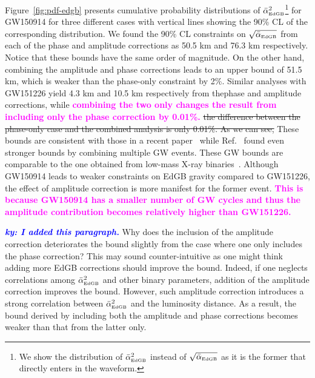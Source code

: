 \documentclass[prd,twocolumn,nofootinbib]{revtex4-1}
\newcommand{\EDGB}{{\mbox{\tiny EdGB}}}
\newcommand{\ky}[1]{\textcolor{blue}{\it{\textbf{ky: #1}}} }
\newcommand{\kent}[1]{\textcolor{magenta}{\textbf{#1}} }
\begin{document}
Figure~\ref{fig:pdf-edgb} presents cumulative probability distributions of $\bar{\alpha}^2_{\EDGB}$\footnote{We show the distribution of $\bar{\alpha}^2_{\EDGB}$ instead of $\sqrt{\bar{\alpha}_{\EDGB}}$ as it is the former that directly enters in the waveform.} for GW150914 for three different cases with vertical lines showing the 90\% CL of the corresponding distribution. We found the 90\% CL constraints on  $\sqrt{\bar{\alpha}_{\EDGB}}$ from each of the phase and amplitude corrections as 50.5 km and 76.3 km respectively. Notice that these bounds have the same order of magnitude. On the other hand, combining the amplitude and phase corrections leads to an upper bound of 51.5 km, which is weaker than the  phase-only constraint by 2\%.
Similar analyses with GW151226 yield 4.3 km and 10.5 km respectively from thephase and amplitude corrections,
while \kent{combining the two only changes the result from including only the phase correction by 0.01\%.} \sout{the difference between the phase-only case and the combined analysis  is only 0.01\%. As we can see,} 
These bounds are consistent with those in a recent paper~\cite{Nair:2019iur} while Ref.~\cite{Yamada:2019zrb} found even stronger bounds by combining multiple GW events. These GW bounds are comparable to the one obtained from low-mass X-ray binaries~\cite{Yagi:2012gp}.
Although GW150914 leads to weaker constraints on EdGB gravity compared to GW151226, the effect of amplitude correction is more manifest for the former event. \kent{This is because GW150914 has a smaller number of GW cycles and thus the amplitude contribution becomes relatively higher than GW151226.}

\ky{I added this paragraph.}
Why does the inclusion of the amplitude correction deteriorates the bound slightly from the case where one only includes the phase correction? This may sound counter-intuitive as one might think adding more EdGB corrections should improve the bound. Indeed, if one neglects correlations among $\bar \alpha^2_\EDGB$ and other binary parameters, addition of the amplitude correction improves the bound. However, such amplitude correction introduces a strong correlation between $\bar \alpha^2_\EDGB$ and the luminosity distance. As a result, the bound derived by including both the amplitude and phase corrections becomes weaker than that from the latter only.
\end{document}
